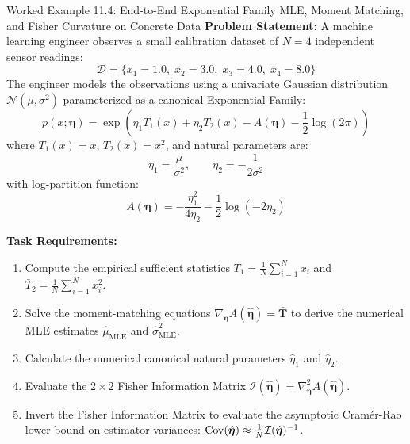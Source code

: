 \begin{examplebox}[breakable]{Worked Example 11.4: End-to-End Exponential Family MLE, Moment Matching, and Fisher Curvature on Concrete Data}
\textbf{Problem Statement:}
A machine learning engineer observes a small calibration dataset of $N = 4$ independent sensor readings:
\begin{equation}
\mathcal{D} = \{ x_1 = 1.0, \; x_2 = 3.0, \; x_3 = 4.0, \; x_4 = 8.0 \}
\end{equation}
The engineer models the observations using a univariate Gaussian distribution $\mathcal{N}(\mu, \sigma^2)$ parameterized as a canonical Exponential Family:
\begin{equation}
p(x; \boldsymbol{\eta}) = \exp\left( \eta_1 T_1(x) + \eta_2 T_2(x) - A(\boldsymbol{\eta}) - \frac{1}{2}\log(2\pi) \right)
\end{equation}
where $T_1(x) = x$, $T_2(x) = x^2$, and natural parameters are:
\begin{equation}
\eta_1 = \frac{\mu}{\sigma^2}, \qquad \eta_2 = -\frac{1}{2\sigma^2}
\end{equation}
with log-partition function:
\begin{equation}
A(\boldsymbol{\eta}) = -\frac{\eta_1^2}{4\eta_2} - \frac{1}{2}\log(-2\eta_2)
\end{equation}

\textbf{Task Requirements:}
\begin{enumerate}
    \item Compute the empirical sufficient statistics $\bar{T}_1 = \frac{1}{N}\sum_{i=1}^N x_i$ and $\bar{T}_2 = \frac{1}{N}\sum_{i=1}^N x_i^2$.
    \item Solve the moment-matching equations $\nabla_{\boldsymbol{\eta}} A(\hat{\boldsymbol{\eta}}) = \bar{\mathbf{T}}$ to derive the numerical MLE estimates $\hat{\mu}_{\text{MLE}}$ and $\hat{\sigma}^2_{\text{MLE}}$.
    \item Calculate the numerical canonical natural parameters $\hat{\eta}_1$ and $\hat{\eta}_2$.
    \item Evaluate the $2 \times 2$ Fisher Information Matrix $\mathcal{I}(\hat{\boldsymbol{\eta}}) = \nabla_{\boldsymbol{\eta}}^2 A(\hat{\boldsymbol{\eta}})$.
    \item Invert the Fisher Information Matrix to evaluate the asymptotic Cramér-Rao lower bound on estimator variances: $\operatorname{Cov}(\hat{\boldsymbol{\eta}}) \approx \frac{1}{N}\mathcal{I}(\hat{\boldsymbol{\eta}})^{-1}$.
\end{enumerate}


\end{examplebox}

